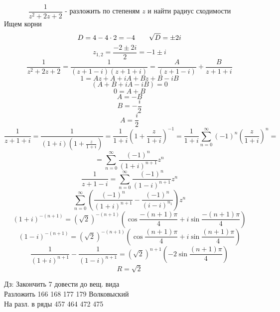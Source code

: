 \documentclass[main]{subfiles}
\begin{document}
\begin{lect}
   \begin{Task}[7]
       \[\frac{1}{z^2 + 2z + 2} \text{ - разложить по степеням $z$ и найти радиус сходимости}\]
       Ищем корни
       \[D = 4 - 4 \cdot 2 = -4 \qquad \sqrt{D} = \pm2i\]
       \[z_{1, 2} = \frac{-2 \pm 2i}{2} = -1 \pm i \]
       \[\frac{1}{z^2 + 2z + 2} = \frac{1}{(z + 1 - i)(z + 1 + i)} = \frac{A}{(z + 1 - i)} + 
       \frac{B}{z + 1 + i}\]
       \[1 = Az + A + iA + Bz + B - iB\]
       \[(A + B + iA - iB) = 0\]
       \[0 = A + B\]
       \[A = -B\]
       \[B = -\frac{i}{2}\]
       \[A = \frac{i}{2}\]
       \[\frac{1}{z + 1 + i} = \frac{1}{(1 + i)(1 + \frac{z}{1 + i})} = \frac{1}{1 + i} 
       (1 + \frac{z}{1 + i})^{-1} = \frac{1}{1 + i} \sum_{n = 0}^\infty(-1)^n (\frac{z}{1 + i})^n  = \]
       \[= \sum_{n = 0}^\infty \frac{(-1)^n}{(1 + i)^{n + 1} }z^n\]
       \[\frac{1}{z + 1 - i} =  \sum_{n = 0}^\infty 
       \frac{(-1)^n}{(1 - i)^{n + 1} }z^n\]
       \[\sum_{n = 0}^\infty (\frac{(-1)^n}{(1 + i)^{n + 1} } - \frac{(-1)^n}{(i - i)^{n _ 1} })z^n \]
       \[(1 + i)^{-(n + 1)} = (\sqrt{2})^{-(n + 1)} \left(\cos \frac{-(n + 1)\pi}{4} + 
       i\sin \frac{-(n + 1)\pi}{4}\right)  \]
       \[(1 - i)^{-(n + 1)} = (\sqrt{2})^{-(n + 1)} 
       \left(\cos \frac{(n + 1)\pi}{4} + i\sin \frac{(n + 1)\pi }{4}\right)  \]
       \[\frac{1}{(1 + i)^{n + 1} } - \frac{1}{(1 - i)^{n + 1} } = (\sqrt{2})^{n + 1} (-2\sin 
       \frac{(n + 1)\pi}{4}) \]
       \[R = \sqrt{2}\]
   \end{Task}

   Дз: Закончить 7 довести до вещ. вида\\
    Разложить 166 168 177 179 Волковыский\\
    На разл. в ряды 457 464 472 475
\end{lect}
\end{document}
